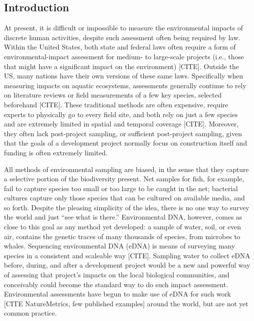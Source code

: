 \documentclass[
]{article}
\begin{document}
\hypertarget{introduction}{%
\subsection{Introduction}\label{introduction}}

At present, it is difficult or impossible to measure the environmental
impacts of discrete human activities, despite such assessment often
being required by law. Within the United States, both state and federal
laws often require a form of environmental-impact assessment for medium-
to large-scale projects (i.e., those that might have a significant
impact on the environment) {[}CITE{]}. Outside the US, many nations have
their own versions of these same laws. Specifically when measuring
impacts on aquatic ecosystems, assessments generally continue to rely on
literature reviews or field measurements of a few key species, selected
beforehand {[}CITE{]}. These traditional methods are often expensive,
require experts to physically go to every field site, and both rely on
just a few species and are extremely limited in spatial and temporal
coverage {[}CITE{]}. Moreover, they often lack post-project sampling, or
sufficient post-project sampling, given that the goals of a development
project normally focus on construction itself and funding is often
extremely limited.

All methods of environmental sampling are biased, in the sense that they
capture a selective portion of the biodiversity present. Net samples for
fish, for example, fail to capture species too small or too large to be
caught in the net; bacterial cultures capture only those species that
can be cultured on available media, and so forth. Despite the pleasing
simplicity of the idea, there is no one way to survey the world and just
``see what is there.'' Environmental DNA, however, comes as close to
this goal as any method yet developed: a sample of water, soil, or even
air, contains the genetic traces of many thousands of species, from
microbes to whales. Sequencing environmental DNA (eDNA) is means of
surveying many species in a consistent and scaleable way {[}CITE{]}.
Sampling water to collect eDNA before, during, and after a development
project would be a new and powerful way of assessing that project's
impacts on the local biological communities, and conceivably could
become the standard way to do such impact assessment. Environmental
assessments have begun to make use of eDNA for such work {[}CITE
NatureMetrics, few published examples{]} around the world, but are not
yet common practice.
\end{document}
